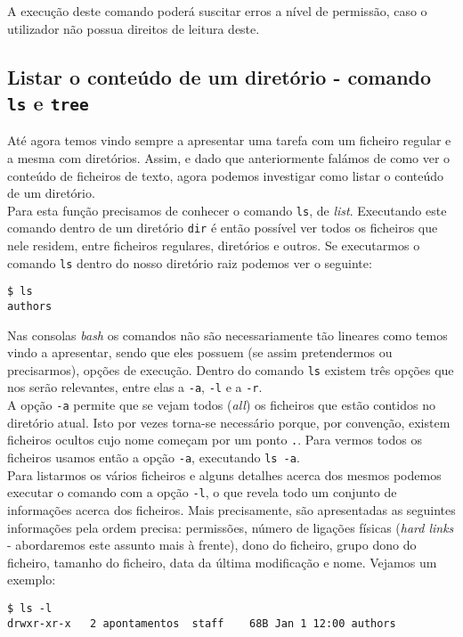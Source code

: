 \documentclass[a4paper, onecolumn, 10pt]{report}
\begin{document}
A execução deste comando poderá suscitar erros a nível de permissão, caso o utilizador não possua direitos de leitura deste.

\subsection{Listar o conteúdo de um diretório - comando \texttt{ls} e \texttt{tree}}

Até agora temos vindo sempre a apresentar uma tarefa com um ficheiro regular e a mesma com diretórios. Assim, e dado que anteriormente falámos de como ver o conteúdo de ficheiros de texto, agora podemos investigar como listar o conteúdo de um diretório. \\
Para esta função precisamos de conhecer o comando \texttt{ls}, de \textit{list}. Executando este comando dentro de um diretório \texttt{dir} é então possível ver todos os ficheiros que nele residem, entre ficheiros regulares, diretórios e outros. Se executarmos o comando \texttt{ls} dentro do nosso diretório raiz podemos ver o seguinte:

\begin{lstlisting}[style=console]
$ ls
authors
\end{lstlisting}

Nas consolas \textit{bash} os comandos não são necessariamente tão lineares como temos vindo a apresentar, sendo que eles possuem (se assim pretendermos ou precisarmos), opções de execução. Dentro do comando \texttt{ls} existem três opções que nos serão relevantes, entre elas a \texttt{-a}, \texttt{-l} e a \texttt{-r}. \\
A opção \texttt{-a} permite que se vejam todos (\textit{all}) os ficheiros que estão contidos no diretório atual. Isto por vezes torna-se necessário porque, por convenção, existem ficheiros ocultos cujo nome começam por um ponto \texttt{.}. Para vermos todos os ficheiros usamos então a opção \texttt{-a}, executando \texttt{ls -a}. \\
Para listarmos os vários ficheiros e alguns detalhes acerca dos mesmos podemos executar o comando com a opção \texttt{-l}, o que revela todo um conjunto de informações acerca dos ficheiros. Mais precisamente, são apresentadas as seguintes informações pela ordem precisa: permissões, número de ligações físicas (\textit{hard links} - abordaremos este assunto mais à frente), dono do ficheiro, grupo dono do ficheiro, tamanho do ficheiro, data da última modificação e nome. Vejamos um exemplo:

\begin{lstlisting}[style=console]
$ ls -l
drwxr-xr-x   2 apontamentos  staff    68B Jan 1 12:00 authors
\end{lstlisting}
\end{document}
